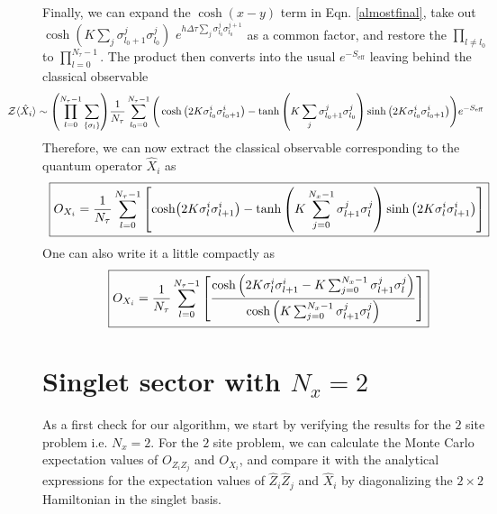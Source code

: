 \documentclass[../thesis_main.tex]{subfiles}
\begin{document}
Finally, we can expand the $\cosh(x-y)$ term in Eqn. \eqref{almostfinal}, take out $\cosh(K \sum_j \sigma^j_{l_0+1} \sigma^j_{l_0})$ $e^{ h \Delta \tau  \sum_j \sigma^j_{l_0} \sigma^{j+1}_{l_0}}$ as a common factor, and restore the $\prod_{l \neq l_0}$ to $\prod_{l = 0}^{N_\tau - 1}$. The product then converts into the usual $e^{-S_\text{eff}}$ leaving behind the classical observable
\begin{align}
    & \hspace*{-1.2cm} \mathcal{Z} \langle \hat{X}_i \rangle \sim \qty(\prod_{l=0}^{N_\tau - 1} \sum_{\{\sigma_l \}}) \frac{1}{N_\tau} \sum_{l_0 = 0}^{N_\tau - 1} \Bigg( \cosh\qty(2K \sigma^{i}_{l_0} \sigma^{i}_{l_0 + 1}) - \tanh\qty(K \sum_j \sigma^j_{l_0+1} \sigma^j_{l_0}) \sinh\qty(2K \sigma^{i}_{l_0} \sigma^{i}_{l_0 + 1}) \Bigg)e^{-S_\text{eff}}
\end{align}
Therefore, we can now extract the classical observable corresponding to the quantum operator $\hat{X}_i$ as
\begin{equation}
    \boxed{
        O_{{X}_i} = \frac{1}{N_\tau} \sum_{l=0}^{N_\tau -1} \qty[\cosh(2K\sigma^{i}_{l} \sigma^{i}_{l + 1}) - \tanh\qty(K \sum_{j=0}^{N_x-1} \sigma^j_{l+1} \sigma^j_{l}) \sinh\qty(2K \sigma^{i}_{l} \sigma^{i}_{l + 1}) ]
    }
     \label{classicalxi_1}
\end{equation} 
One can also write it a little compactly as 
\begin{equation}
    \boxed{
        O_{{X}_i} = \frac{1}{N_\tau} \sum_{l=0}^{N_\tau -1} \qty[\frac{\cosh\qty(2K\sigma^{i}_{l} \sigma^{i}_{l + 1} - K \sum_{j=0}^{N_x-1} \sigma^j_{l+1} \sigma^j_{l})}{\cosh\qty(K \sum_{j=0}^{N_x-1} \sigma^j_{l+1} \sigma^j_{l})}]
    }
    \label{classicalxi_2}
\end{equation}




\section{Singlet sector with $N_x = 2$}
As a first check for our algorithm, we start by verifying the results for the $2$ site problem i.e. $N_x = 2$. For the $2$ site problem, we can calculate the Monte Carlo expectation values of $O_{Z_i Z_j}$ and $O_{X_i}$, and compare it with the analytical expressions for the expectation values of $\hat{Z}_i \hat{Z}_j$ and $\hat{X}_i$ by diagonalizing the $2 \times 2$ Hamiltonian in the singlet basis.
\end{document}

